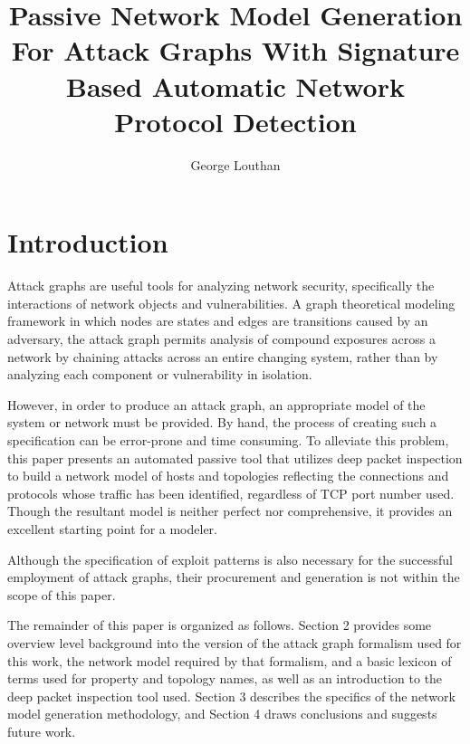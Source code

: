 \documentclass{article}
\author{George Louthan}
\title{Passive Network Model Generation For Attack Graphs With Signature 
	Based Automatic Network Protocol Detection}
\begin{document}
\maketitle
{}
\section{Introduction}
Attack graphs are useful tools for analyzing network security, specifically
the interactions of network objects and vulnerabilities.
A graph theoretical modeling framework in which nodes are states and edges
are transitions caused by an adversary, the attack graph permits analysis 
of compound exposures across a network by
chaining attacks across an entire changing system, rather than by
analyzing each component or vulnerability in isolation. 

However, in order to produce an attack graph, an appropriate model of the
system or network must be provided. By hand, the process of creating such a 
specification can be error-prone
and time consuming. To alleviate this problem, this paper presents an
automated passive tool that utilizes deep packet inspection to build a network 
model of hosts and topologies reflecting the connections and protocols whose 
traffic has been identified, regardless of TCP port number used. Though the
resultant model is neither perfect nor comprehensive, it provides an excellent
starting point for a modeler.

Although the specification of exploit patterns is also necessary for the
successful employment of attack graphs, their procurement and generation is
not within the scope of this paper.

The remainder of this paper is organized as follows. Section 2 provides some
overview level background into the version of the attack graph formalism used
for this work, the network model required by that formalism, and a basic
lexicon of terms used for property and topology names, as well as an
introduction to the deep packet inspection tool used. Section 3 describes the
specifics of the network model generation methodology, and Section 4 draws
conclusions and suggests future work.
\end{document}
